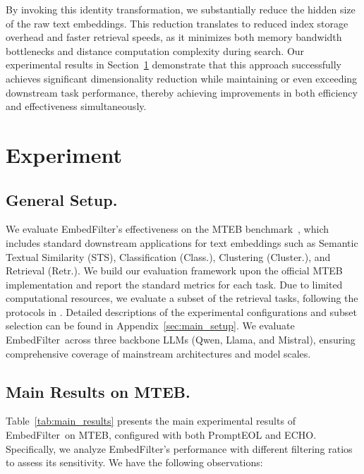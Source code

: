 \documentclass{llmxive}
\providecommand{\name}{EmbedFilter}
\begin{document}
By invoking this identity transformation, we substantially reduce the hidden size of the raw text embeddings. 
This reduction translates to reduced index storage overhead and faster retrieval speeds, as it minimizes both memory bandwidth bottlenecks and distance computation complexity during search. 
Our experimental results in Section~\ref{sec:exp} demonstrate that this approach successfully achieves significant dimensionality reduction while maintaining or even exceeding downstream task performance, thereby achieving improvements in both efficiency and effectiveness simultaneously.



\section{Experiment}
\label{sec:exp}
\subsection{General Setup.}
We evaluate \name's effectiveness on the MTEB benchmark~\cite{mteb}, which includes standard downstream applications for text embeddings such as Semantic Textual Similarity (STS), Classification (Class.), Clustering (Cluster.), and Retrieval (Retr.).
We build our evaluation framework upon the official MTEB implementation and report the standard metrics for each task.
Due to limited computational resources, we evaluate a subset of the retrieval tasks, following the protocols in \cite{llm2vec, moee}.
Detailed descriptions of the experimental configurations and subset selection can be found in Appendix~\ref{sec:main_setup}.
We evaluate \name\ across three backbone LLMs (Qwen, Llama, and Mistral), ensuring comprehensive coverage of mainstream architectures and model scales.


\subsection{Main Results on MTEB.}
Table~\ref{tab:main_results} presents the main experimental results of \name\ on MTEB, configured with both PromptEOL and ECHO.
Specifically, we analyze \name's performance with different filtering ratios to assess its sensitivity.
We have the following observations:
\end{document}
